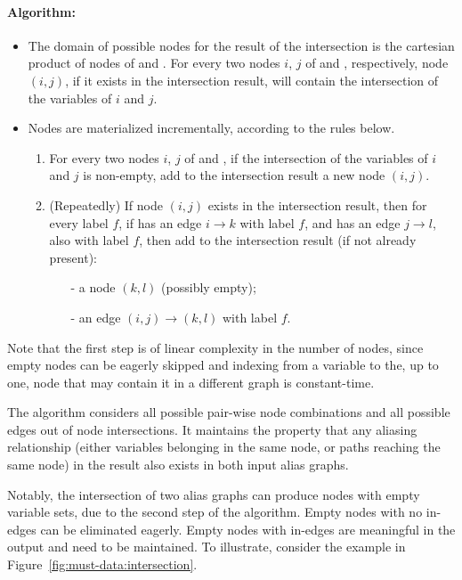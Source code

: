 \paragraph{Algorithm: }
\begin{itemize}
\item The domain of possible nodes for the result of the intersection is the cartesian product of nodes of  and . For every two nodes $i$, $j$ of  and , respectively, node $(i,j)$, if it exists in the intersection result, will contain the intersection of the variables of $i$ and $j$.

\item Nodes are materialized incrementally, according to the rules below.
\begin{enumerate}
    \item For every two nodes $i$, $j$ of  and , if the intersection of the variables of $i$ and $j$ is non-empty, add to the intersection result a new node $(i,j)$.

    \item (Repeatedly) If node $(i,j)$ exists in the intersection result, then for every label $f$, if  has an edge $i \rightarrow k$ with label $f$, and  has an edge $j \rightarrow l$, also with label $f$, then add to the intersection result (if not already present):
    \begin{itemize}
        \item[-] a node $(k,l)$ (possibly empty);
        \item[-] an edge $(i,j) \rightarrow (k,l)$ with label $f$.
    \end{itemize}
\end{enumerate}
\end{itemize}

Note that the first step is of linear complexity in the number of nodes, since empty nodes can be eagerly skipped and indexing from a variable to the, up to one, node that may contain it in a different graph is constant-time.

The algorithm considers all possible pair-wise node combinations and all possible edges out of node intersections. It maintains the property that any aliasing relationship (either variables belonging in the same node, or paths reaching the same node) in the result also exists in both input alias graphs.

Notably, the intersection of two alias graphs can produce nodes with empty variable sets, due to the second step of the algorithm. Empty nodes with no in-edges can be eliminated eagerly. Empty nodes with in-edges are meaningful in the output and need to be maintained. To illustrate, consider the example in Figure~\ref{fig:must-data:intersection}.

